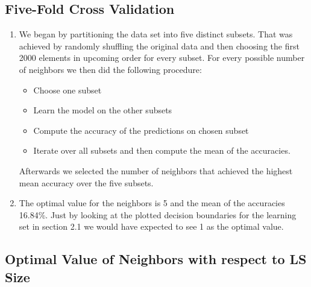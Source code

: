 \documentclass{article}
\begin{document}
\subsection{Five-Fold Cross Validation}

\begin{enumerate}
	\item We began by partitioning the data set into five distinct subsets. That was achieved by randomly shuffling the original data and then choosing the first 2000 elements in upcoming order for every subset. For every possible number of neighbors we then did the following procedure:
	\begin{itemize}
		\item Choose one subset
		\item Learn the model on the other subsets
		\item Compute the accuracy of the predictions on chosen subset
		\item Iterate over all subsets and then compute the mean of the accuracies.
	\end{itemize}
	Afterwards we selected the number of neighbors that achieved the highest mean accuracy over the five subsets.
	\item
	The optimal value for the neighbors is 5 and the mean of the accuracies 16.84\%. Just by looking at the plotted decision boundaries for the learning set in section 2.1 we would have expected to see 1 as the optimal value. 
\end{enumerate}

\subsection{Optimal Value of Neighbors with respect to LS Size}
\end{document}
